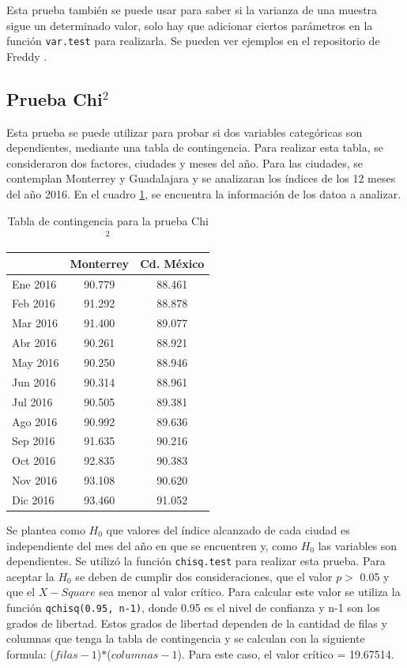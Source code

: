 \documentclass{article}
\begin{document}
    
Esta prueba también se puede usar para saber si la varianza de una muestra sigue un determinado valor, solo hay que adicionar ciertos parámetros en la función \texttt{var.test} para realizarla. Se pueden ver ejemplos en el repositorio de Freddy \cite{freddy}.
    
\subsection{Prueba Chi$^2$}
Esta prueba se puede utilizar para probar si dos variables categóricas son dependientes, mediante una tabla de contingencia. Para realizar esta tabla, se consideraron dos factores, ciudades y meses del año. Para las ciudades, se contemplan Monterrey y Guadalajara y se analizaran los índices de los 12 meses del año 2016. En el cuadro \ref{tablacontingencia}, se encuentra la información de los datoa a analizar.
    
\begin{table}
\centering
\caption{Tabla de contingencia para la prueba Chi$^2$}
\begin{tabular}{|l|c|c|}
\hline
         & Monterrey & Cd. México \\ \hline
 Ene 2016 & 90.779    & 88.461     \\ \hline
 Feb 2016 & 91.292    & 88.878     \\ \hline
 Mar 2016 & 91.400    & 89.077     \\ \hline
 Abr 2016 & 90.261    & 88.921     \\ \hline
 May 2016 & 90.250    & 88.946     \\ \hline
 Jun 2016 & 90.314    & 88.961     \\ \hline
 Jul 2016 & 90.505    & 89.381     \\ \hline
 Ago 2016 & 90.992    & 89.636     \\ \hline
 Sep 2016 & 91.635    & 90.216     \\ \hline
 Oct 2016 & 92.835    & 90.383     \\ \hline
 Nov 2016 & 93.108    & 90.620     \\ \hline
 Dic 2016 & 93.460    & 91.052     \\ \hline
\end{tabular}
\label{tablacontingencia}
\end{table}

Se plantea como $H_{0}$ que valores del índice alcanzado de cada ciudad es independiente del mes del año en que se encuentren y, como $H_{0}$ las variables son dependientes. Se utilizó la función \texttt{chisq.test} para realizar esta prueba. Para aceptar la $H_{0}$ se deben de cumplir dos consideraciones, que el valor $p >$ 0.05 y que el $X-Square$ sea menor al valor crítico. Para calcular este valor se utiliza la función \texttt{qchisq(0.95, n-1)}, donde 0.95 es el nivel de confianza y n-1 son los grados de libertad. Estos grados de libertad dependen de la cantidad de filas y columnas que tenga la tabla de contingencia y se calculan con la siguiente formula: ($filas-1$)$*$($columnas-1$). Para este caso, el valor crítico = 19.67514.
\end{document}
